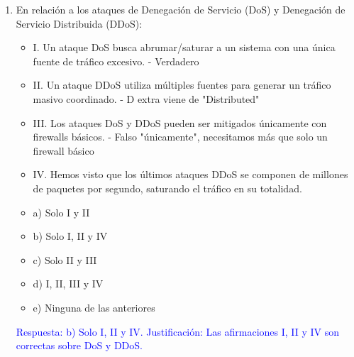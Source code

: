 \documentclass[a4paper]{article}
\begin{document}
\begin{enumerate}
    \item En relación a los ataques de Denegación de Servicio (DoS) y Denegación de Servicio Distribuida (DDoS):
    \begin{itemize}
        \item I. Un ataque DoS busca abrumar/saturar a un sistema con una única fuente de tráfico excesivo. - Verdadero
        \item II. Un ataque DDoS utiliza múltiples fuentes para generar un tráfico masivo coordinado. - D extra viene de "Distributed"
        \item III. Los ataques DoS y DDoS pueden ser mitigados únicamente con firewalls básicos. - Falso "únicamente", necesitamos más que solo un firewall básico
        \item IV. Hemos visto que los últimos ataques DDoS se componen de millones de paquetes por segundo, saturando el tráfico en su totalidad.
    \end{itemize}
    \begin{itemize}
        \item a) Solo I y II
        \item b) Solo I, II y IV
        \item c) Solo II y III
        \item d) I, II, III y IV
        \item e) Ninguna de las anteriores
    \end{itemize}
    \textcolor{blue}{Respuesta: b) Solo I, II y IV. Justificación: Las afirmaciones I, II y IV son correctas sobre DoS y DDoS.}
    \vspace{1cm}
    

\end{enumerate}
\end{document}
